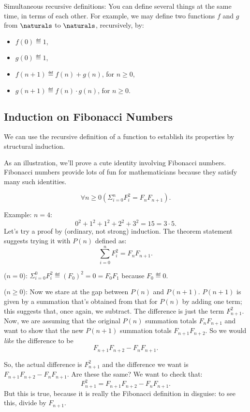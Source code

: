 \begin{editingnotes}

\item[Simultaneous recursive definitions:]
  You can define several things at the same time, in terms of each
  other.  For example, we may define two functions $f$ and $g$ from
  $\naturals$ to $\naturals$, recursively, by:
  \begin{itemize}
  \item
    $f(0) \eqdef 1$,
  \item
    $g(0) \eqdef 1$,
  \item
    $f(n+1) \eqdef f(n) + g(n)$, for $n \geq 0$,
  \item
    $g(n+1) \eqdef f(n) \cdot g(n)$, for $n \geq 0$.
  \end{itemize}

\end{editingnotes}

\begin{editingnotes}

\subsection{Induction on Fibonacci Numbers}

We can use the recursive definition of a function to establish its
properties by structural induction.

As an illustration, we'll prove a cute identity involving Fibonacci
numbers.  Fibonacci numbers provide lots of fun for mathematicians because
they satisfy many such identities.
\begin{proposition}
\[
\forall n \geq 0 (\Sigma_{i=0}^n F_i^2 = F_n F_{n+1}).
\]
\end{proposition}

Example: $n = 4$:
\[
0^2 + 1^2 + 1^2 + 2^2 + 3^2 = 15 = 3 \cdot 5.
\]
Let's try a proof by (ordinary, not strong) induction.  The theorem
statement suggests trying it with $P(n)$ defined as:
\[
\sum_{i=0}^n F_i^2 = F_n F_{n+1}.
\]

 ($n=0$):
$\Sigma_{i=0}^0 F_i^2 \eqdef (F_0)^2 = 0 = F_0 F_1$ because
$F_0 \eqdef 0$.

 ($n\geq 0$): Now we stare at the gap
between $P(n)$ and $P(n+1)$.  $P(n+1)$ is given by a summation that's
obtained from that for $P(n)$ by adding one term; this suggests that,
once again, we subtract.  The difference is just the term $F_{n+1}^2$.
Now, we are assuming that the original $P(n)$ summation totals $F_n
F_{n+1}$ and want to show that the new $P(n+1)$ summation totals
$F_{n+1} F_{n+2}$.  So we would \emph{like} the difference to be
\[
F_{n+1} F_{n+2} - F_n F_{n+1}.
\]

So, the actual difference is $F_{n+1}^2$ and the difference we want is
$F_{n+1} F_{n+2} - F_n F_{n+1}$.  Are these the same?  We want to check
that:
\[
F_{n+1}^2 = F_{n+1} F_{n+2} - F_n F_{n+1}.
\]
But this is true, because it is really the Fibonacci definition in
disguise: to see this, divide by $F_{n+1}$.

\end{editingnotes}

